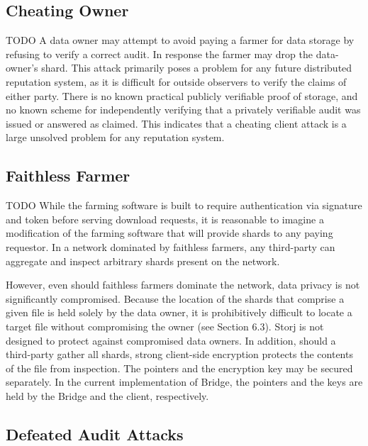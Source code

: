 \documentclass[a4paper,10pt]{article} \usepackage[utf8]{inputenc}
\newcommand{\todo}[1]{{\color{red} TODO #1 }}
\begin{document}
\subsection{Cheating Owner}

\todo{ A data owner may attempt to avoid paying a farmer for data storage by
refusing to verify a correct audit. In response the farmer may drop the
data-owner's shard. This attack primarily poses a problem for any future
distributed reputation system, as it is difficult for outside observers to
verify the claims of either party. There is no known practical publicly
verifiable proof of storage, and no known scheme for independently verifying
that a privately verifiable audit was issued or answered as claimed. This
indicates that a cheating client attack is a large unsolved problem for any
reputation system. }

\subsection{Faithless Farmer}

\todo{ While the farming software is built to require authentication via
signature and token before serving download requests, it is reasonable to
imagine a modification of the farming software that will provide shards to any
paying requestor. In a network dominated by faithless farmers, any third-party
can aggregate and inspect arbitrary shards present on the network.

However, even should faithless farmers dominate the network, data privacy is not
significantly compromised. Because the location of the shards that comprise a
given file is held solely by the data owner, it is prohibitively difficult to
locate a target file without compromising the owner (see Section 6.3). Storj is
not designed to protect against compromised data owners. In addition, should a
third-party gather all shards, strong client-side encryption protects the
contents of the file from inspection. The pointers and the encryption key may be
secured separately. In the current implementation of Bridge, the pointers and
the keys are held by the Bridge and the client, respectively. }

\subsection{Defeated Audit Attacks}
\end{document}
